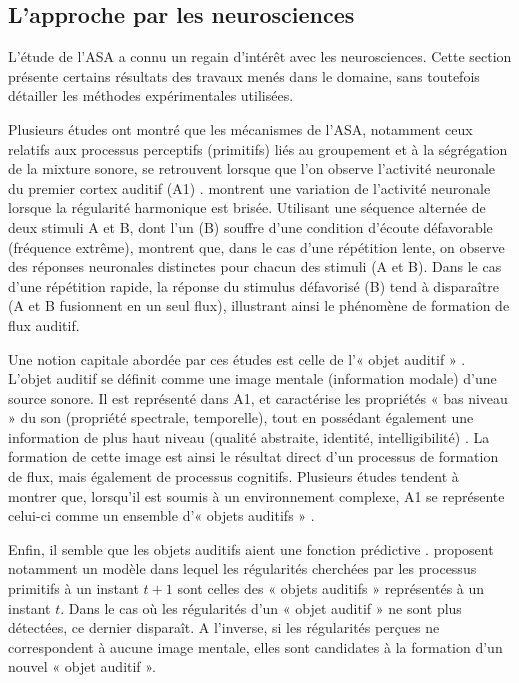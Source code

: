 \subsection{L'approche par les neurosciences}
\label{sec:ch3_asaNeuro}

L'étude de l'ASA a connu un regain d'intérêt avec les neurosciences. Cette section présente certains résultats des travaux menés dans le domaine, sans toutefois détailler les méthodes expérimentales utilisées.

Plusieurs études ont montré que les mécanismes de l'ASA, notamment ceux relatifs aux processus perceptifs (primitifs) liés au groupement et à la ségrégation de la mixture sonore, se retrouvent lorsque que l'on observe l'activité neuronale du premier cortex auditif (A1) \citep{nelken2004processing,carlyon2004brain,snyder2007toward}. \citep{dyson2004representation} montrent une variation de l'activité neuronale lorsque la régularité harmonique est brisée. Utilisant une séquence alternée de deux stimuli A et B, dont l'un (B) souffre d'une condition d'écoute défavorable (fréquence extrême), \citep{fishman2001neural} montrent que, dans le cas d'une répétition lente, on observe des réponses neuronales distinctes pour chacun des stimuli (A et B). Dans le cas d'une répétition rapide, la réponse du stimulus défavorisé (B) tend à disparaître (A et B fusionnent en un seul flux), illustrant ainsi le phénomène de formation de flux auditif.
   
Une notion capitale abordée par ces études est celle de l'« objet auditif » \citep{nelken2004processing}. L'objet auditif se définit comme une image mentale (information modale) d'une source sonore. Il est représenté dans A1, et caractérise les propriétés « bas niveau » du son (propriété spectrale, temporelle), tout en possédant également une information de plus haut niveau (qualité abstraite, identité, intelligibilité) \citep{nelken2008neurons}. La formation de cette image est ainsi le résultat direct d'un processus de formation de flux, mais également de processus cognitifs. Plusieurs études tendent à montrer que, lorsqu'il est soumis à un environnement complexe, A1 se représente celui-ci comme un ensemble d'« objets auditifs » \citep{kocsis2016promoting}.

Enfin, il semble que les objets auditifs aient une fonction prédictive \citep{winkler2015auditory}. \citep{winkler2009modeling} proposent notamment un modèle dans lequel les régularités cherchées par les processus primitifs à un instant $t+1$ sont celles des « objets auditifs » représentés à un instant $t$. Dans le cas où les régularités d'un « objet auditif » ne sont plus détectées, ce dernier disparaît. A l'inverse, si les régularités perçues ne correspondent à aucune image mentale, elles sont candidates à la formation d'un nouvel « objet auditif ».

